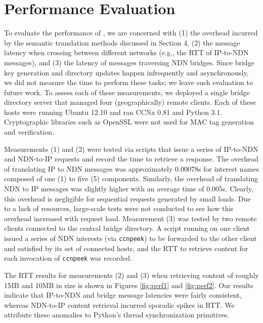 \section{Performance Evaluation}
To evaluate the performance of \sink, we are concerned with (1) the overhead incurred by the semantic translation methods discussed in Section 4, (2) the message latency when crossing between different networks (e.g., the RTT of IP-to-NDN messages), and (3) the latency of messages traversing NDN bridges. Since bridge key generation and directory updates happen infrequently and asynchronously, we did not measure the time to perform these tasks; we leave such evaluation to future work. To assess each of these measurements, we deployed a single bridge directory server that managed four (geographically) remote clients. Each of these hosts were running Ubuntu 12.10 and ran CCNx 0.81 and Python 3.1. Cryptographic libraries such as OpenSSL were not used for MAC tag generation and verification. 

Measurements (1) and (2) were tested via scripts that issue a series of IP-to-NDN and NDN-to-IP requests and record the time to retrieve a response. The overhead of translating IP to NDN messages was approximately 0.00078s for interest names composed of one (1) to five (5) components. Similarly, the overhead of translating NDN to IP messages was slightly higher with an average time of 0.005s. Clearly, this overhead is negligible for sequential requests generated by small loads. Due to a lack of resources, large-scale tests were not conducted to see how this overhead increased with request load. Measurement (3) was tested by two remote clients connected to the central bridge directory. A script running on one client issued a series of NDN interests (via {\tt ccnpeek}) to be forwarded to the other client and satisfied by its set of connected hosts, and the RTT to retrieve content for each invocation of {\tt ccnpeek} was recorded. 

The RTT results for measurements (2) and (3) when retrieving content of roughly 1MB and 10MB in size is shown in Figures \ref{fig:perf1} and \ref{fig:perf2}. Our results indicate that IP-to-NDN and bridge message latencies were fairly consistent, whereas NDN-to-IP content retrieval incurred sporadic spikes in RTT. We attribute these anomalies to Python's thread synchronization primitives. 

